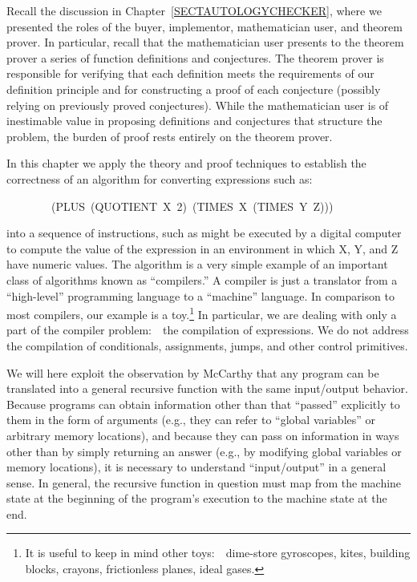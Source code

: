 \documentclass[10pt]{book}
\newenvironment{pubasis}{\begin{flushleft}}{\end{flushleft}}
\begin{document}
Recall the discussion in Chapter~\ref{SECTAUTOLOGYCHECKER}, where we presented
the roles of the buyer, implementor, mathematician user, and
theorem prover.  In particular, recall that the mathematician user
presents to the theorem prover a series of function definitions
and conjectures.  The theorem prover is responsible
for verifying that each definition meets the requirements
of our definition principle and for constructing
a proof of each conjecture (possibly relying on previously
proved conjectures).  While the mathematician user is of inestimable
value in proposing definitions and conjectures that structure
the problem, the burden of proof rests entirely on the theorem
prover.

In this chapter we apply the theory and proof
techniques to establish the correctness of an algorithm for
converting expressions such as:
\begin{pubasis}
~~~~~~~~(PLUS~(QUOTIENT~X~2)~(TIMES~X~(TIMES~Y~Z)))\\
\end{pubasis}
into a sequence of instructions, such as might be executed by a
digital computer to compute the value of the expression in an
environment in which X, Y, and Z have numeric values.
The algorithm is a very simple
example of an important class of algorithms known as ``compilers.''
A compiler is just a translator from a ``high-level'' programming
language to a ``machine'' language.
In comparison to most compilers, our example is a toy.\footnote{It is useful to keep in mind other toys:~~dime-store gyroscopes, kites, building blocks, crayons, frictionless planes, ideal gases.}
In particular, we are dealing with only a part of the compiler
problem:~~the compilation of expressions.  We do not address the
compilation of conditionals, assignments, jumps, and other
control primitives.

We will here exploit the observation by McCarthy \cite{MCCARTHYSYMB}
that any program can be translated into a general recursive function with the
same input/output behavior.  Because programs can obtain information
other than that ``passed'' explicitly to them in the form of arguments
(e.g., they can refer to ``global variables'' or arbitrary memory
locations), and because they can pass on information in ways other
than by simply returning an answer (e.g., by modifying
global variables or memory locations), it is necessary to understand
``input/output'' in a general sense.
In general, the recursive function in question must map from
the machine state at the beginning of the program's execution to the machine state
at the end.
\end{document}
